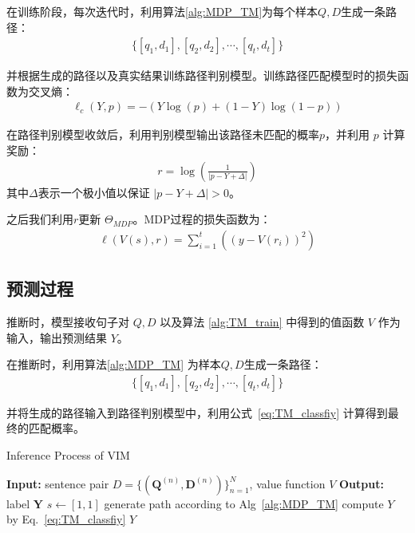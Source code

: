 在训练阶段，每次迭代时，利用算法\ref{alg:MDP_TM}为每个样本$Q, D$生成一条路径：
\begin{equation}\label{eq:mdp_path}
	\begin{aligned}
		\{[q_1, d_1], [q_2, d_2], \cdots, [q_t, d_t]\}
	\end{aligned}
\end{equation}

并根据生成的路径以及真实结果训练路径判别模型。训练路径匹配模型时的损失函数为交叉熵：
\begin{equation}\label{eq:classify_model}
	\begin{aligned}
		\ell_c(Y, p) = -(Y\log(p) + (1-Y)\log(1-p))
	\end{aligned}
\end{equation}

在路径判别模型收敛后，利用判别模型输出该路径未匹配的概率$p$，并利用 $p$ 计算奖励：
\begin{equation}\label{eq:reward}
	\begin{aligned}
		r = \log(\frac{1}{|p-Y+\Delta|})
	\end{aligned}
\end{equation}
其中$\Delta$表示一个极小值以保证 $|p-Y+\Delta| > 0$。

之后我们利用$r$更新 $\Theta_{MDP}$。MDP过程的损失函数为：
\begin{equation}\label{eq:}
	\begin{aligned}
		\ell(V(s), r) = \sum_{i=1}^t\left((y - V(r_i))^2\right)
	\end{aligned}
\end{equation}



\subsection{预测过程}
推断时，模型接收句子对 $Q, D$ 以及算法 \ref{alg:TM_train} 中得到的值函数 $V$ 作为输入，输出预测结果 $Y$。

在推断时，利用算法\ref{alg:MDP_TM} 为样本$Q, D$生成一条路径：
\begin{equation}\label{eq:}
	\begin{aligned}
		\{[q_1, d_1], [q_2, d_2], \cdots, [q_t, d_t]\}
	\end{aligned}
\end{equation}

并将生成的路径输入到路径判别模型中，利用公式~\ref{eq:TM_classfiy} 计算得到最终的匹配概率。

\begin{algorithm}[!htbp]
    \small
    \caption{Inference Process of VIM}\label{alg:TM_inf}
    \begin{algorithmic}
        \STATE \textbf{Input:} sentence pair $D=\{ (\mathbf{Q}^{(n)}, \mathbf{D}^{(n)})\}_{n=1}^N$, value function $V$
        \STATE \textbf{Output:} label $\mathbf{Y}$
        \STATE $s \leftarrow [1,1]$
        \STATE generate path according to Alg~\ref{alg:MDP_TM}
        \STATE compute $Y$ by Eq.~\ref{eq:TM_classfiy}
        \STATE \RETURN  $Y$
    \end{algorithmic}
\end{algorithm}

